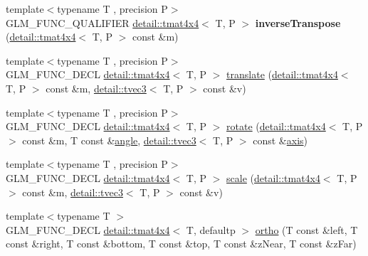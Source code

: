 \begin{DoxyCompactItemize}
\item 
{\footnotesize template$<$typename T , precision P$>$ }\\G\+L\+M\+\_\+\+F\+U\+N\+C\+\_\+\+Q\+U\+A\+L\+I\+F\+I\+ER \hyperlink{structglm_1_1detail_1_1tmat4x4}{detail\+::tmat4x4}$<$ T, P $>$ {\bfseries inverse\+Transpose} (\hyperlink{structglm_1_1detail_1_1tmat4x4}{detail\+::tmat4x4}$<$ T, P $>$ const \&m)\hypertarget{namespaceglm_aaf03d778a4023049e562c382ad880d56}{}\label{namespaceglm_aaf03d778a4023049e562c382ad880d56}

\item 
{\footnotesize template$<$typename T , precision P$>$ }\\G\+L\+M\+\_\+\+F\+U\+N\+C\+\_\+\+D\+E\+CL \hyperlink{structglm_1_1detail_1_1tmat4x4}{detail\+::tmat4x4}$<$ T, P $>$ \hyperlink{group__gtc__matrix__transform_ga1501de0fa580dcc491b67e0685bbc7c2}{translate} (\hyperlink{structglm_1_1detail_1_1tmat4x4}{detail\+::tmat4x4}$<$ T, P $>$ const \&m, \hyperlink{structglm_1_1detail_1_1tvec3}{detail\+::tvec3}$<$ T, P $>$ const \&v)
\item 
{\footnotesize template$<$typename T , precision P$>$ }\\G\+L\+M\+\_\+\+F\+U\+N\+C\+\_\+\+D\+E\+CL \hyperlink{structglm_1_1detail_1_1tmat4x4}{detail\+::tmat4x4}$<$ T, P $>$ \hyperlink{group__gtc__matrix__transform_ga61e65a3bb227c267d1a15113d1056fb1}{rotate} (\hyperlink{structglm_1_1detail_1_1tmat4x4}{detail\+::tmat4x4}$<$ T, P $>$ const \&m, T const \&\hyperlink{group__gtc__quaternion_ga23a3fc7ada5bbb665ff84c92c6e0542c}{angle}, \hyperlink{structglm_1_1detail_1_1tvec3}{detail\+::tvec3}$<$ T, P $>$ const \&\hyperlink{group__gtc__quaternion_ga8eef9f8c3f2e4836dccf09df975b20fb}{axis})
\item 
{\footnotesize template$<$typename T , precision P$>$ }\\G\+L\+M\+\_\+\+F\+U\+N\+C\+\_\+\+D\+E\+CL \hyperlink{structglm_1_1detail_1_1tmat4x4}{detail\+::tmat4x4}$<$ T, P $>$ \hyperlink{group__gtc__matrix__transform_gabd40959f269abd16c256a4f59ab03d62}{scale} (\hyperlink{structglm_1_1detail_1_1tmat4x4}{detail\+::tmat4x4}$<$ T, P $>$ const \&m, \hyperlink{structglm_1_1detail_1_1tvec3}{detail\+::tvec3}$<$ T, P $>$ const \&v)
\item 
{\footnotesize template$<$typename T $>$ }\\G\+L\+M\+\_\+\+F\+U\+N\+C\+\_\+\+D\+E\+CL \hyperlink{structglm_1_1detail_1_1tmat4x4}{detail\+::tmat4x4}$<$ T, defaultp $>$ \hyperlink{group__gtc__matrix__transform_gac393e9262776e4980731c386123e4377}{ortho} (T const \&left, T const \&right, T const \&bottom, T const \&top, T const \&z\+Near, T const \&z\+Far)

\end{DoxyCompactItemize}
